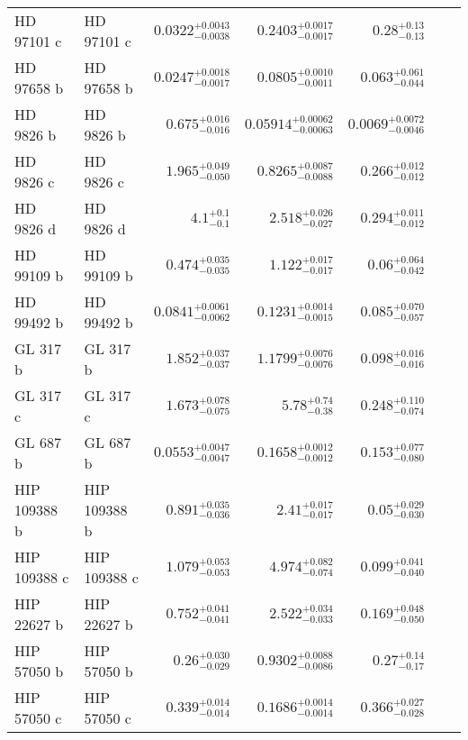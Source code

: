 \begin{longtable*}{llrrrrr}
HD 97101 c & HD 97101 c & $0.0322^{+0.0043}_{-0.0038}$ & $0.2403^{+0.0017}_{-0.0017}$ & $0.28^{+0.13}_{-0.13}$ & \cite{Dedrick et al. in prep} & \\ 
HD 97658 b & HD 97658 b & $0.0247^{+0.0018}_{-0.0017}$ & $0.0805^{+0.0010}_{-0.0011}$ & $0.063^{+0.061}_{-0.044}$ & \cite{Howard11} & \\ 
HD 9826 b & HD 9826 b & $0.675^{+0.016}_{-0.016}$ & $0.05914^{+0.00062}_{-0.00063}$ & $0.0069^{+0.0072}_{-0.0046}$ & \cite{Butler97} & \\ 
HD 9826 c & HD 9826 c & $1.965^{+0.049}_{-0.050}$ & $0.8265^{+0.0087}_{-0.0088}$ & $0.266^{+0.012}_{-0.012}$ & \cite{Naef04} & \\ 
HD 9826 d & HD 9826 d & $4.1^{+0.1}_{-0.1}$ & $2.518^{+0.026}_{-0.027}$ & $0.294^{+0.011}_{-0.012}$ & \cite{Naef04} & \\ 
HD 99109 b & HD 99109 b & $0.474^{+0.035}_{-0.035}$ & $1.122^{+0.017}_{-0.017}$ & $0.06^{+0.064}_{-0.042}$ & \cite{Butler06} & \\ 
HD 99492 b & HD 99492 b & $0.0841^{+0.0061}_{-0.0062}$ & $0.1231^{+0.0014}_{-0.0015}$ & $0.085^{+0.070}_{-0.057}$ & \cite{Marcy05} & \\ 
GL 317 b & GL 317 b & $1.852^{+0.037}_{-0.037}$ & $1.1799^{+0.0076}_{-0.0076}$ & $0.098^{+0.016}_{-0.016}$ & \cite{Johnson07b} & \\ 
GL 317 c & GL 317 c & $1.673^{+0.078}_{-0.075}$ & $5.78^{+0.74}_{-0.38}$ & $0.248^{+0.110}_{-0.074}$ & \cite{Anglada-Escude12} & \\ 
GL 687 b & GL 687 b & $0.0553^{+0.0047}_{-0.0047}$ & $0.1658^{+0.0012}_{-0.0012}$ & $0.153^{+0.077}_{-0.080}$ & \cite{Burt14} & \\ 
HIP 109388 b & HIP 109388 b & $0.891^{+0.035}_{-0.036}$ & $2.41^{+0.017}_{-0.017}$ & $0.05^{+0.029}_{-0.030}$ & \cite{Butler06_GJ849} & \\ 
HIP 109388 c & HIP 109388 c & $1.079^{+0.053}_{-0.053}$ & $4.974^{+0.082}_{-0.074}$ & $0.099^{+0.041}_{-0.040}$ & \cite{Feng15} & \\ 
HIP 22627 b & HIP 22627 b & $0.752^{+0.041}_{-0.041}$ & $2.522^{+0.034}_{-0.033}$ & $0.169^{+0.048}_{-0.050}$ & \cite{Howard10} & \\ 
HIP 57050 b & HIP 57050 b & $0.26^{+0.030}_{-0.029}$ & $0.9302^{+0.0088}_{-0.0086}$ & $0.27^{+0.14}_{-0.17}$ & \cite{Haghighipour10} & \\ 
HIP 57050 c & HIP 57050 c & $0.339^{+0.014}_{-0.014}$ & $0.1686^{+0.0014}_{-0.0014}$ & $0.366^{+0.027}_{-0.028}$ & \cite{Trifonov17} & \\ 

\end{longtable*}
